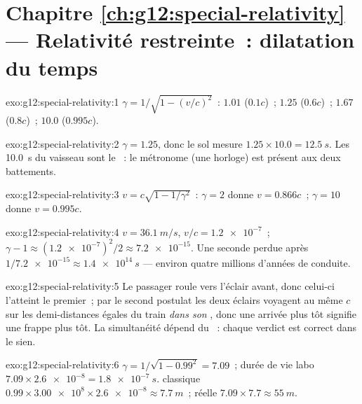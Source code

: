 \section*{Chapitre \ref{ch:g12:special-relativity} --- Relativité restreinte~: dilatation du temps}

\begin{solution}{exo:g12:special-relativity:1}
$\gamma = 1/\sqrt{1 - (v/c)^2}$~: $1.01$ ($0.1c$)~; $1.25$ ($0.6c$)~;
$1.67$ ($0.8c$)~; $10.0$ ($0.995c$).
\end{solution}

\begin{solution}{exo:g12:special-relativity:2}
$\gamma = 1.25$, donc le sol mesure $1.25 \times 10.0 =
\qty{12.5}{s}$. Les \qty{10.0}{s} du vaisseau sont le
~: le métronome (une horloge)
est présent aux deux battements.
\end{solution}

\begin{solution}{exo:g12:special-relativity:3}
$v = c\sqrt{1 - 1/\gamma^2}$~: $\gamma = 2$ donne $v = 0.866c$~;
$\gamma = 10$ donne $v = 0.995c$.
\end{solution}

\begin{solution}{exo:g12:special-relativity:4}
$v = \qty{36.1}{m/s}$, $v/c = \num{1.2e-7}$~;
$\gamma - 1 \approx (\num{1.2e-7})^2/2 \approx \num{7.2e-15}$. Une
seconde perdue après $1/\num{7.2e-15} \approx \qty{1.4e14}{s}$ ---
environ quatre millions d'années de conduite.
\end{solution}

\begin{solution}{exo:g12:special-relativity:5}
Le passager roule vers l'éclair avant, donc celui-ci l'atteint le
premier~; par le second postulat les deux éclairs voyagent au même
$c$ sur les demi-distances égales du train \emph{dans son
}, donc une arrivée plus tôt signifie une frappe plus
tôt. La simultanéité dépend du ~: chaque verdict est
correct dans le sien.
\end{solution}

\begin{solution}{exo:g12:special-relativity:6}
$\gamma = 1/\sqrt{1 - 0.99^2} = 7.09$~; durée de vie labo
$7.09 \times \num{2.6e-8} = \qty{1.8e-7}{s}$.
 classique $0.99 \times \num{3.00e8} \times
\num{2.6e-8} \approx \qty{7.7}{m}$~; réelle $7.09 \times 7.7 \approx
\qty{55}{m}$.
\end{solution}

